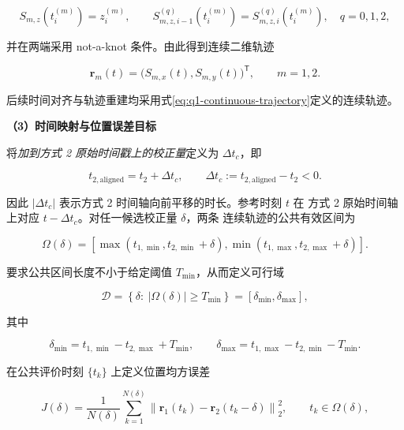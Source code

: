 \begin{equation}
S_{m,z}(t_i^{(m)})=z_i^{(m)},\qquad
S_{m,z,i-1}^{(q)}(t_i^{(m)})=S_{m,z,i}^{(q)}(t_i^{(m)}),
\quad q=0,1,2,
\label{eq:q1-spline-conditions}
\end{equation}

并在两端采用 not-a-knot 条件。由此得到连续二维轨迹

\begin{equation}
\mathbf r_m(t)=\bigl(S_{m,x}(t),S_{m,y}(t)\bigr)^{\mathsf T},
\qquad m=1,2.
\label{eq:q1-continuous-trajectory}
\end{equation}

后续时间对齐与轨迹重建均采用式\eqref{eq:q1-continuous-trajectory}定义的连续轨迹。

\noindent\textbf{（3）时间映射与位置误差目标}

将\emph{加到方式 2 原始时间戳上的校正量}定义为 \(\Delta t_c\)，即

\begin{equation}
t_{2,\mathrm{aligned}}=t_2+\Delta t_c,
\qquad
\Delta t_c:=t_{2,\mathrm{aligned}}-t_2<0.
\label{eq:q1-time-map}
\end{equation}

因此 \(|\Delta t_c|\) 表示方式 2 时间轴向前平移的时长。参考时刻 \(t\) 在
方式 2 原始时间轴上对应 \(t-\Delta t_c\)。对任一候选校正量 \(\delta\)，两条
连续轨迹的公共有效区间为

\begin{equation}
\Omega(\delta)=
\left[
\max(t_{1,\min},t_{2,\min}+\delta),
\min(t_{1,\max},t_{2,\max}+\delta)
\right].
\label{eq:q1-overlap}
\end{equation}

要求公共区间长度不小于给定阈值 \(T_{\min}\)，从而定义可行域

\begin{equation}
\mathcal D=\left\{\delta:\ |\Omega(\delta)|\ge T_{\min}\right\}
=\left[\delta_{\min},\delta_{\max}\right],
\label{eq:q1-feasible-domain}
\end{equation}

其中

\begin{equation}
\delta_{\min}=t_{1,\min}-t_{2,\max}+T_{\min},\qquad
\delta_{\max}=t_{1,\max}-t_{2,\min}-T_{\min}.
\label{eq:q1-feasible-bounds}
\end{equation}

在公共评价时刻 \(\{t_k\}\) 上定义位置均方误差

\begin{equation}
J(\delta)=\frac{1}{N(\delta)}
\sum_{k=1}^{N(\delta)}
\left\|\mathbf r_1(t_k)-\mathbf r_2(t_k-\delta)\right\|_2^2,
\qquad t_k\in\Omega(\delta),
\label{eq:q1-objective}
\end{equation}

